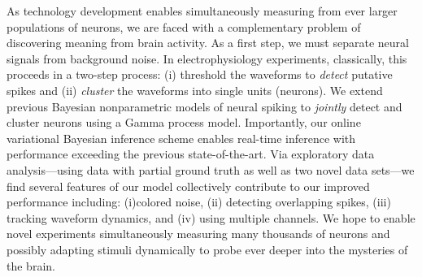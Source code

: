 
As technology development enables simultaneously measuring from ever larger populations of neurons, we are faced with a complementary problem of discovering meaning from brain activity.  As a first step, we must separate neural signals from background noise.  In electrophysiology experiments, classically, this proceeds in a two-step process: (i) threshold the waveforms to \emph{detect} putative spikes and (ii) \emph{cluster} the waveforms into single units (neurons).  We extend previous Bayesian nonparametric models of neural spiking to \emph{jointly} detect and cluster neurons using a Gamma process model.  Importantly, our online variational Bayesian inference scheme enables real-time inference with performance exceeding the previous state-of-the-art. Via exploratory data analysis---using data with partial ground truth as well as two novel data sets---we find several features of our model collectively contribute to our improved performance including: (i)colored noise, (ii) detecting overlapping spikes, (iii) tracking waveform dynamics, and (iv) using multiple channels.  
We hope to enable novel experiments simultaneously measuring many thousands of neurons and possibly adapting stimuli dynamically to probe ever deeper into the mysteries of the brain.
 